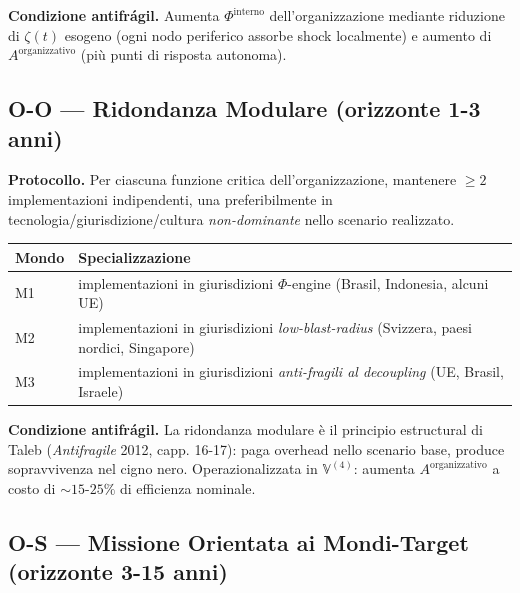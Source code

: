 \Proved{} \textbf{Condizione antifrágil.} Aumenta
\(\Phi^{\text{interno}}\) dell'organizzazione mediante riduzione di
\(\zeta(t)\) esogeno (ogni nodo periferico assorbe shock localmente) e
aumento di \(A^{\text{organizzativo}}\) (più punti di risposta
autonoma).

\subsection{O-O --- Ridondanza Modulare (orizzonte 1-3
anni)}\label{o-o-ridondanza-modulare-orizzonte-1-3-anni}

\Hypoth{} \textbf{Protocollo.} Per ciascuna funzione critica
dell'organizzazione, mantenere \(\geq 2\) implementazioni indipendenti,
una preferibilmente in tecnologia/giurisdizione/cultura
\emph{non-dominante} nello scenario realizzato.

{\def\LTcaptype{none} %
{\small\begin{longtable}[]{@{}
  >{\raggedright\arraybackslash}p{}
  >{\raggedright\arraybackslash}p{}@{}}
\toprule\noalign{}
\begin{minipage}[b]{\linewidth}\raggedright
Mondo
\end{minipage} & \begin{minipage}[b]{\linewidth}\raggedright
Specializzazione
\end{minipage} \\
\midrule\noalign{}
\endhead
\bottomrule\noalign{}
\endlastfoot
M1 & implementazioni in giurisdizioni \(\Phi\)-engine (Brasil,
Indonesia, alcuni UE) \\
M2 & implementazioni in giurisdizioni \emph{low-blast-radius} (Svizzera,
paesi nordici, Singapore) \\
M3 & implementazioni in giurisdizioni \emph{anti-fragili al decoupling}
(UE, Brasil, Israele) \\
\end{longtable}}
}

\Proved{} \textbf{Condizione antifrágil.} La ridondanza modulare è il
principio estructural di Taleb (\emph{Antifragile} 2012, capp. 16-17):
paga overhead nello scenario base, produce sopravvivenza nel cigno nero.
Operazionalizzata in \(\mathbb{V}^{(4)}\): aumenta
\(A^{\text{organizzativo}}\) a costo di \(\sim 15\)-\(25\%\) di
efficienza nominale.

\subsection{O-S --- Missione Orientata ai Mondi-Target (orizzonte 3-15
anni)}\label{o-s-missione-orientata-ai-mondi-target-orizzonte-3-15-anni}

